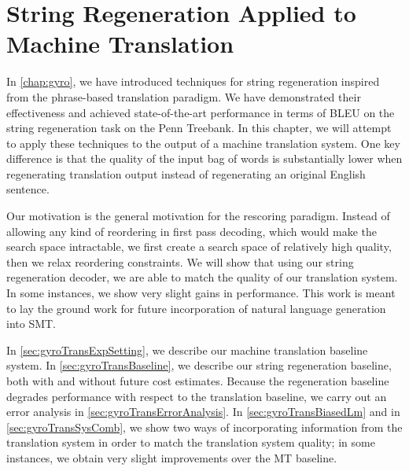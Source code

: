\chapter{String Regeneration Applied to Machine Translation}
\label{chap:gyroTrans}


In \autoref{chap:gyro}, we have introduced
techniques for string regeneration inspired from
the phrase-based translation paradigm.
We have demonstrated their effectiveness
and achieved state-of-the-art performance in terms of
BLEU on the string regeneration task on the Penn Treebank.
In this chapter, we will attempt to apply these techniques to the output
of a machine translation system. One key difference is that
the quality of the input bag of words is substantially lower when
regenerating translation output instead of regenerating
an original English sentence.

Our motivation is the general motivation for the rescoring paradigm.
Instead of allowing any kind of reordering in first pass
decoding, which would make the search space intractable, we first create a
search space of relatively high
quality, then we relax reordering constraints.
We will show that using our string regeneration decoder,
we are able to match the quality of our translation
system. In some instances, we show very slight gains in
performance. This work is meant to lay the ground
work for future incorporation of natural language
generation into SMT.

In \autoref{sec:gyroTransExpSetting}, we describe
our machine translation baseline system.
In \autoref{sec:gyroTransBaseline}, we describe
our string regeneration baseline, both with and without
future cost estimates. Because the regeneration baseline
degrades performance with respect to the translation
baseline, we carry out an error analysis
in \autoref{sec:gyroTransErrorAnalysis}.
In \autoref{sec:gyroTransBiasedLm} and
in \autoref{sec:gyroTransSysComb}, we show two ways of incorporating
information from the translation system in order to match
the translation system quality; in some instances,
we obtain very slight improvements over the MT baseline.

